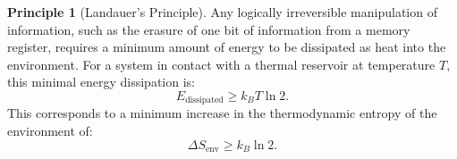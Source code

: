 \documentclass[11pt, letterpaper]{report}
\theoremstyle{plain} %
\theoremstyle{definition} %
\newtheorem{principle}{Principle}[chapter]
\theoremstyle{remark} %
\begin{document}
\begin{principle}[Landauer's Principle]
\label{principle:landauer}
Any logically irreversible manipulation of information, such as the erasure of one bit of information from a memory register, requires a minimum amount of energy to be dissipated as heat into the environment. For a system in contact with a thermal reservoir at temperature $T$, this minimal energy dissipation is:
\begin{equation}
    E_{\text{dissipated}} \ge k_B T \ln 2.
    \label{eq:landauer_energy}
\end{equation}
This corresponds to a minimum increase in the thermodynamic entropy of the environment of:
\begin{equation}
    \Delta S_{\text{env}} \ge k_B \ln 2.
    \label{eq:landauer_entropy}
\end{equation}
\end{principle}
\end{document}
